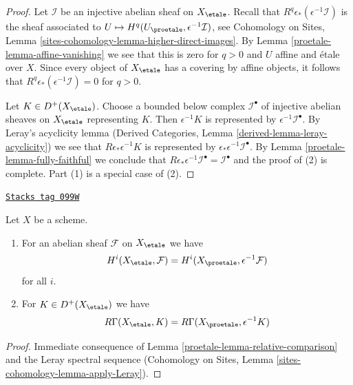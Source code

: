 \begin{proof}

Let $\mathcal{I}$ be an injective abelian sheaf on $X_\etale$.
Recall that $R^q\epsilon_*(\epsilon^{-1}\mathcal{I})$ is the sheaf associated
to $U \mapsto H^q(U_\proetale, \epsilon^{-1}\mathcal{I})$, see
Cohomology on Sites, Lemma \ref{sites-cohomology-lemma-higher-direct-images}.
By Lemma \ref{proetale-lemma-affine-vanishing} we see that this is zero for $q > 0$
and $U$ affine and \'etale over $X$. Since every object of
$X_\etale$ has a covering by affine objects, it follows that
$R^q\epsilon_*(\epsilon^{-1}\mathcal{I}) = 0$ for $q > 0$.

\medskip\noindent
Let $K \in D^+(X_\etale)$. Choose a bounded below complex $\mathcal{I}^\bullet$
of injective abelian sheaves on $X_\etale$ representing $K$.
Then $\epsilon^{-1}K$ is represented by $\epsilon^{-1}\mathcal{I}^\bullet$.
By Leray's acyclicity lemma (Derived Categories, Lemma
\ref{derived-lemma-leray-acyclicity}) we see that $R\epsilon_*\epsilon^{-1}K$
is represented by $\epsilon_*\epsilon^{-1}\mathcal{I}^\bullet$.
By Lemma \ref{proetale-lemma-fully-faithful} we conclude that
$R\epsilon_*\epsilon^{-1}\mathcal{I}^\bullet = \mathcal{I}^\bullet$
and the proof of (2) is complete. Part (1) is a special case of (2).
\end{proof}

\begin{lemma}
\label{proetale-lemma-compare-cohomology}
\href{https://stacks.math.columbia.edu/tag/099W}{\texttt{Stacks tag 099W}}

Let $X$ be a scheme.
\begin{enumerate}
\item For an abelian sheaf $\mathcal{F}$ on $X_\etale$ we have
$$
H^i(X_\etale, \mathcal{F}) =
H^i(X_\proetale, \epsilon^{-1}\mathcal{F})
$$
for all $i$.
\item For $K \in D^+(X_\etale)$ we have
$$
R\Gamma(X_\etale, K) = R\Gamma(X_\proetale, \epsilon^{-1}K)
$$
\end{enumerate}
\end{lemma}

\begin{proof}

Immediate consequence of Lemma \ref{proetale-lemma-relative-comparison} and
the Leray spectral sequence (Cohomology on Sites, Lemma
\ref{sites-cohomology-lemma-apply-Leray}).
\end{proof}


